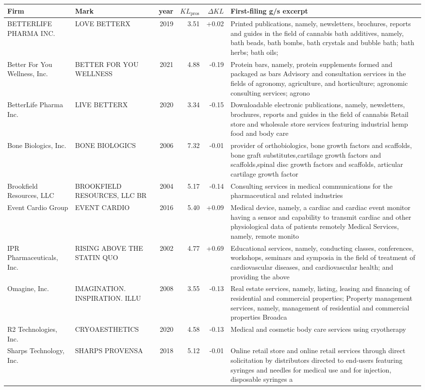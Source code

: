 \begin{tabular}{p{4.0cm}p{2.2cm}rrrp{6.5cm}}
\toprule
Firm & Mark & year & $KL_\text{pros}$ & $\Delta KL$ & First-filing g/s excerpt \\
\midrule
BETTERLIFE PHARMA INC. & LOVE BETTERX & 2019 & 3.51 & +0.02 & Printed publications, namely, newsletters, brochures, reports and guides in the field of cannabis bath additives, namely, bath beads, bath bombs, bath crystals and bubble bath; bath herbs; bath oils;  \\
Better For You Wellness, Inc. & BETTER FOR YOU WELLNESS & 2021 & 4.88 & -0.19 & Protein bars, namely, protein supplements formed and packaged as bars Advisory and consultation services in the fields of agronomy, agriculture, and horticulture; agronomic consulting services; agrono \\
BetterLife Pharma Inc. & LIVE BETTERX & 2020 & 3.34 & -0.15 & Downloadable electronic publications, namely, newsletters, brochures, reports and guides in the field of cannabis Retail store and wholesale store services featuring industrial hemp food and body care \\
Bone Biologics, Inc. & BONE BIOLOGICS & 2006 & 7.32 & -0.01 & provider of orthobiologics, bone growth factors and scaffolds, bone graft substitutes,cartilage growth factors and scaffolds,spinal disc growth factors and scaffolds, articular cartilage growth factor \\
Brookfield Resources, LLC & BROOKFIELD RESOURCES, LLC BR & 2004 & 5.17 & -0.14 & Consulting services in medical communications for the pharmaceutical and related industries \\
Event Cardio Group & EVENT CARDIO & 2016 & 5.40 & +0.09 & Medical device, namely, a cardiac and cardiac event monitor having a sensor and capability to transmit cardiac and other physiological data of patients remotely Medical Services, namely, remote monito \\
IPR Pharmaceuticals, Inc. & RISING ABOVE THE STATIN QUO & 2002 & 4.77 & +0.69 & Educational services, namely, conducting classes, conferences, workshops, seminars and symposia in the field of treatment of cardiovascular diseases, and cardiovascular health; and providing the above \\
Omagine, Inc. & IMAGINATION. INSPIRATION. ILLU & 2008 & 3.55 & -0.13 & Real estate services, namely, listing, leasing and financing of residential and commercial properties; Property management services, namely, management of residential and commercial properties Broadca \\
R2 Technologies, Inc. & CRYOAESTHETICS & 2020 & 4.58 & -0.13 & Medical and cosmetic body care services using cryotherapy \\
Sharps Technology, Inc. & SHARPS PROVENSA & 2018 & 5.12 & -0.01 & Online retail store and online retail services through direct solicitation by distributors directed to end-users featuring syringes and needles for medical use and for injection, disposable syringes a \\
\bottomrule
\end{tabular}
\clearpage

